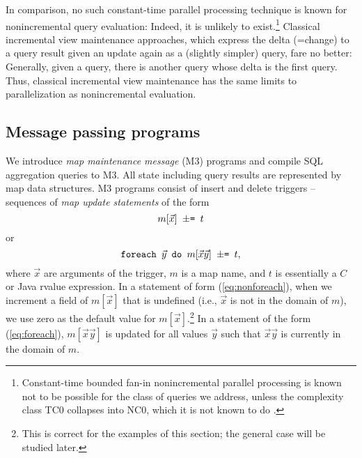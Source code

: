 In comparison, no such constant-time parallel processing technique
is known for nonincremental query
evaluation: Indeed, it is unlikely to exist.\footnote{Constant-time
bounded fan-in nonincremental
parallel processing is known not to be possible for
the class of queries we address,
unless the complexity class TC0 collapses into NC0, which it is not known
to do \cite{Joh90}.} Classical incremental view maintenance approaches, which
express the delta (=change) to a query result given an update again
as a (slightly simpler) query, fare no better: Generally,
given a query, there is another query whose delta is the first query.
Thus, classical incremental view maintenance has the same limits to
parallelization as nonincremental evaluation.


\subsection{Message passing programs}


We introduce {\em map maintenance message}\/ (M3) programs and
compile SQL aggregation queries to M3.
All state including query results are represented by map data
structures. 
M3 programs consist of insert and delete triggers -- sequences
of {\em map update statements}\/ of the form
\begin{equation}
\mbox{{\tt $m[\vec{x}]$ $\pm$= $t$}}
\label{eq:nonforeach}
\end{equation}
or
\begin{equation}
\mbox{{\tt foreach $\vec{y}$ do $m[\vec{x}\vec{y}]$ $\pm$= $t$}},
\label{eq:foreach}
\end{equation}
where $\vec{x}$ are arguments of the trigger,
$m$ is a map name, and $t$ is essentially a $C$ or Java rvalue expression.
In a statement of form (\ref{eq:nonforeach}),
when we increment a field of $m[\vec{x}]$
that is undefined (i.e., $\vec{x}$ is not in the domain of $m$),
we use zero as the default value for $m[\vec{x}]$.\footnote{This is correct
for the examples of this section; the general case will be studied later.}
In a statement of the form (\ref{eq:foreach}),
$m[\vec{x}\vec{y}]$ is updated for all
values $\vec{y}$ such that $\vec{x}\vec{y}$ is currently in the
domain of $m$.


